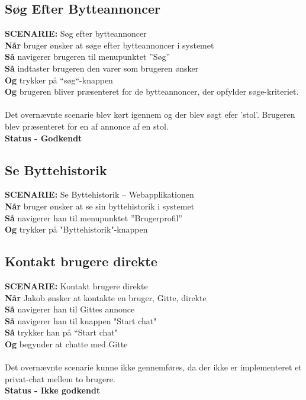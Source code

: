 \subsection{Søg Efter Bytteannoncer}
{\color{blue}\textbf{SCENARIE:}} Søg efter bytteannoncer \\
{\color{blue}\textbf{Når}} bruger ønsker at søge efter bytteannoncer i systemet\\
{\color{blue}\textbf{Så}} navigerer brugeren til menupunktet ”Søg” \\
{\color{blue}\textbf{Så}} indtaster brugeren den varer som brugeren ønsker\\
{\color{blue}\textbf{Og}} trykker på “søg“-knappen \\
{\color{blue}\textbf{Og}} brugeren bliver præsenteret for de bytteannoncer, der opfylder søge-kriteriet. \\ \\
Det overnævnte scenarie blev kørt igennem og der blev søgt efer 'stol'. Brugeren blev præsenteret for en af annonce af en stol. \\
\textbf{Status - Godkendt}

\subsection{Se Byttehistorik}
{\color{blue}\textbf{SCENARIE:}} Se Byttehistorik – Webapplikationen \\
{\color{blue}\textbf{Når}} bruger ønsker at se sin byttehistorik i systemet\\
{\color{blue}\textbf{Så}} navigerer han til menupunktet ”Brugerprofil” \\
{\color{blue}\textbf{Og}} trykker på "Byttehistorik"-knappen

\subsection{Kontakt brugere direkte}
{\color{blue}\textbf{SCENARIE:}} Kontakt brugere direkte\\
{\color{blue}\textbf{Når}} Jakob ønsker at kontakte en bruger, Gitte, direkte \\
{\color{blue}\textbf{Så}} navigerer han til Gittes annonce  \\
{\color{blue}\textbf{Så}} navigerer han til knappen "Start chat" \\
{\color{blue}\textbf{Så}} trykker han på “Start chat" \\
{\color{blue}\textbf{Og}} begynder at chatte med Gitte \\ 
\\
Det overnævnte scenarie kunne ikke gennemføres, da der ikke er implementeret et privat-chat mellem to brugere. \\
\textbf{Status - Ikke godkendt}


